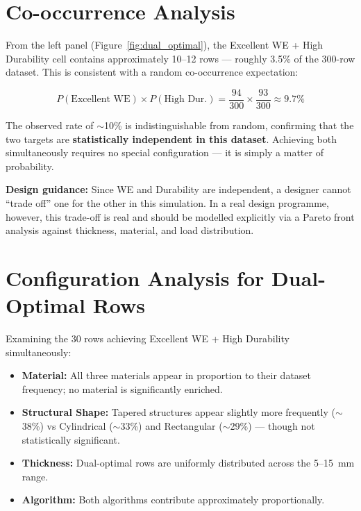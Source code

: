 \documentclass[11pt, a4paper]{report}
\begin{document}
\section{Co-occurrence Analysis}

From the left panel (Figure~\ref{fig:dual_optimal}), the Excellent WE + High Durability cell contains approximately 10--12 rows --- roughly 3.5\% of the 300-row dataset. This is consistent with a random co-occurrence expectation:

\[
P(\text{Excellent WE}) \times P(\text{High Dur.}) = \frac{94}{300} \times \frac{93}{300} \approx 9.7\%
\]

The observed rate of $\sim$10\% is indistinguishable from random, confirming that the two targets are \textbf{statistically independent in this dataset}. Achieving both simultaneously requires no special configuration --- it is simply a matter of probability.

\begin{decisionbox}
\textbf{Design guidance:} Since WE and Durability are independent, a designer cannot ``trade off'' one for the other in this simulation. In a real design programme, however, this trade-off is real and should be modelled explicitly via a Pareto front analysis against thickness, material, and load distribution.
\end{decisionbox}

\section{Configuration Analysis for Dual-Optimal Rows}

Examining the 30 rows achieving Excellent WE + High Durability simultaneously:

\begin{itemize}[nosep]
\item \textbf{Material:} All three materials appear in proportion to their dataset frequency; no material is significantly enriched.
\item \textbf{Structural Shape:} Tapered structures appear slightly more frequently ($\sim$38\%) vs Cylindrical ($\sim$33\%) and Rectangular ($\sim$29\%) --- though not statistically significant.
\item \textbf{Thickness:} Dual-optimal rows are uniformly distributed across the 5--15~mm range.
\item \textbf{Algorithm:} Both algorithms contribute approximately proportionally.
\end{itemize}
\end{document}
